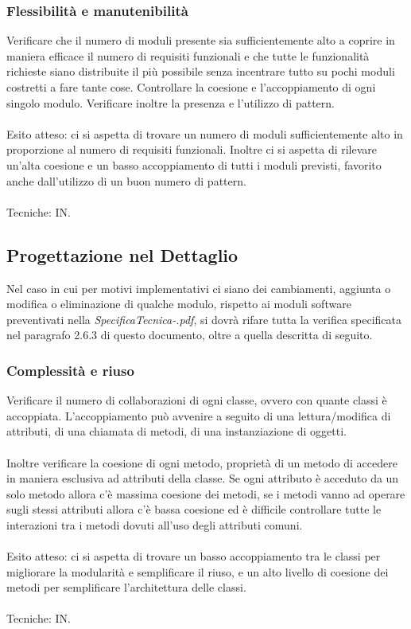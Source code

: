 \subsubsection*{Flessibilit\`a e manutenibilit\`a}

Verificare che il numero di moduli presente sia sufficientemente alto a coprire
in maniera efficace il numero di requisiti funzionali e che tutte le
funzionalit\`a richieste siano distribuite il pi\`u possibile senza incentrare
tutto su pochi moduli costretti a fare tante cose. Controllare la coesione e
l'accoppiamento di ogni singolo modulo. Verificare inoltre la presenza e
l'utilizzo di pattern.
\\\\
Esito atteso: ci si aspetta di trovare un numero di moduli sufficientemente alto
in proporzione al numero di requisiti funzionali. Inoltre ci si aspetta di
rilevare un'alta coesione e un basso accoppiamento di tutti i moduli previsti,
favorito anche dall'utilizzo di un buon numero di pattern. 
\\\\
Tecniche: IN.


\subsection{Progettazione nel Dettaglio}
Nel caso in cui per motivi implementativi ci siano dei
cambiamenti, aggiunta o modifica o eliminazione di qualche modulo, rispetto ai
moduli software preventivati nella \emph{SpecificaTecnica-\versioneST.pdf}, si
dovr\`a rifare tutta la verifica specificata nel paragrafo 2.6.3 di questo
documento, oltre a quella descritta di seguito. 
\subsubsection*{Complessit\`a e riuso}
Verificare il numero di collaborazioni di ogni classe, ovvero con quante classi
\`e accoppiata. L'accoppiamento pu\`o avvenire a seguito di una lettura/modifica
di attributi, di una chiamata di metodi, di una instanziazione di oggetti. \\ \\
Inoltre verificare la coesione di ogni metodo, propriet\`a di un metodo di
accedere in maniera esclusiva ad attributi della classe. Se ogni attributo \`e acceduto da
un solo metodo allora c'\`e massima coesione dei metodi, se i metodi vanno ad
operare sugli stessi attributi allora c'\`e bassa coesione ed \`e difficile
controllare tutte le interazioni tra i metodi dovuti all'uso degli attributi comuni.
\\ \\
Esito atteso: ci si aspetta di trovare un basso accoppiamento tra le classi per
migliorare la modularit\`a e semplificare il riuso, e un alto livello di
coesione dei metodi per semplificare l'architettura delle classi. \\ \\ 
Tecniche: IN.

